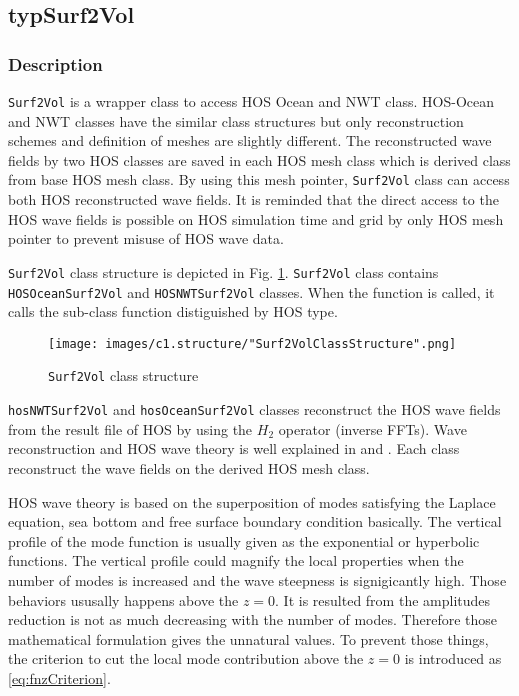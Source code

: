 \pagebreak	
\subsection{typSurf2Vol}

\subsubsection{Description}

\texttt{Surf2Vol} is a wrapper class to access HOS Ocean and NWT class. HOS-Ocean and NWT classes have the similar class structures but only reconstruction schemes and definition of meshes are slightly different. The reconstructed wave fields by two HOS classes are saved in each HOS mesh class which is derived class from base HOS mesh class. By using this mesh pointer, \texttt{Surf2Vol} class can access both HOS reconstructed wave fields. It is reminded that the direct access to the HOS wave fields is possible on HOS simulation time and grid by only HOS mesh pointer to prevent misuse of HOS wave data. 

\texttt{Surf2Vol} class structure is depicted in Fig. \ref{fig:surf2VolStructure}. \texttt{Surf2Vol} class contains \texttt{HOSOceanSurf2Vol} and \texttt{HOSNWTSurf2Vol} classes. When the function is called, it calls the sub-class function distiguished by HOS type. 

\vspace{0.5cm}
{
	\begin{figure} [H]
		\centering
		\texttt{[image: images/c1.structure/"Surf2VolClassStructure".png]}
		\vspace{0.5cm}
		\caption{\texttt{Surf2Vol} class structure}
		\label{fig:surf2VolStructure}
	\end{figure}
}

\pagebreak

\texttt{hosNWTSurf2Vol} and \texttt{hosOceanSurf2Vol} classes reconstruct the HOS wave fields from the result file of HOS by using the $H_2$ operator (inverse FFTs). Wave reconstruction and HOS wave theory is well explained in \cite{ducrozet2007} and \cite{ducrozet2012}. Each class reconstruct the wave fields on the derived HOS mesh class.

HOS wave theory is based on the superposition of modes satisfying the Laplace equation, sea bottom and free surface boundary condition basically. The vertical profile of the mode function is usually given as the exponential or hyperbolic functions. The vertical profile could magnify the local properties when the number of modes is increased and the wave steepness is signigicantly high. Those behaviors ususally happens above the $z=0$. It is resulted from the amplitudes reduction is not as much decreasing with the number of modes. Therefore those mathematical formulation gives the unnatural values. To prevent those things, the criterion to cut the local mode contribution above the $z=0$ is introduced as \eqref{eq:fnzCriterion}. 

